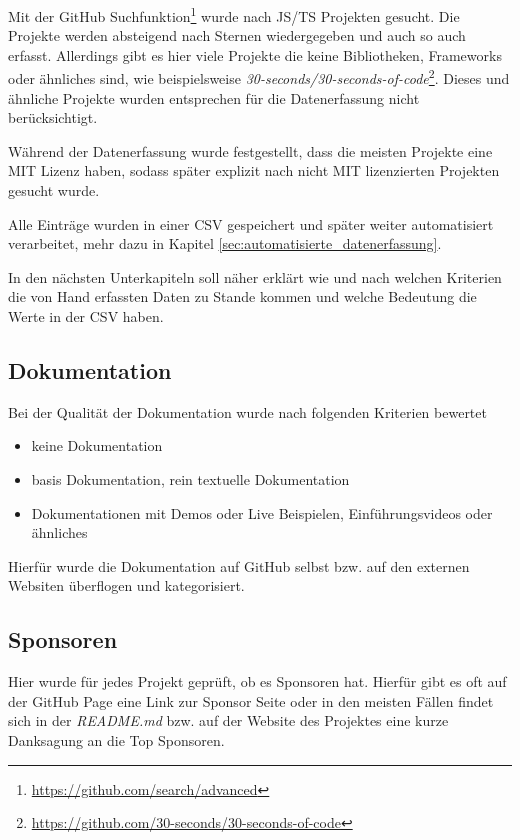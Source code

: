 Mit der GitHub Suchfunktion\footnote{\url{https://github.com/search/advanced}} wurde nach JS/TS Projekten
gesucht. Die Projekte werden absteigend nach Sternen wiedergegeben und auch so auch erfasst.
Allerdings gibt es hier viele Projekte die keine Bibliotheken, Frameworks oder ähnliches sind,
wie beispielsweise
\textit{30-seconds/30-seconds-of-code}\footnote{\url{https://github.com/30-seconds/30-seconds-of-code}}.
Dieses und ähnliche Projekte wurden entsprechen für die Datenerfassung nicht berücksichtigt.

Während der Datenerfassung wurde festgestellt, dass die meisten Projekte eine MIT Lizenz haben,
sodass später explizit nach nicht MIT lizenzierten Projekten gesucht wurde.

Alle Einträge wurden in einer CSV gespeichert und später weiter automatisiert verarbeitet, mehr dazu in
Kapitel \ref{sec:automatisierte_datenerfassung}.


\bigskip
\noindent
In den nächsten Unterkapiteln soll näher erklärt wie und nach welchen Kriterien die von Hand erfassten
Daten zu Stande kommen und welche Bedeutung die Werte in der CSV haben.

\subsection{Dokumentation}
Bei der Qualität der Dokumentation wurde nach folgenden Kriterien bewertet

\begin{itemize}[noitemsep]
    \item[0 =] keine Dokumentation
    \item[1 =] basis Dokumentation, rein textuelle Dokumentation
    \item[2 =] Dokumentationen mit Demos oder Live Beispielen,
        Einführungsvideos oder ähnliches
\end{itemize}

\noindent
Hierfür wurde die Dokumentation auf GitHub selbst bzw. auf den externen Websiten überflogen und
kategorisiert.


\subsection{Sponsoren}
Hier wurde für jedes Projekt geprüft, ob es Sponsoren hat. Hierfür gibt es oft auf der GitHub Page
eine Link zur Sponsor Seite oder in den meisten Fällen findet sich in der \textit{README.md} bzw.
auf der Website des Projektes eine kurze Danksagung an die Top Sponsoren.

